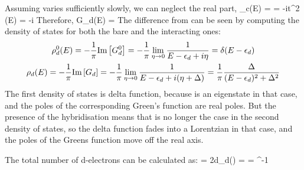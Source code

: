 \documentclass[14pt]{extarticle}
\numberwithin{equation}{section}
\begin{document}
Assuming  varies sufficiently slowly, we can neglect the real part,
\beq
\Sigma_c(E) =  = -i\pi t^2 \rho(E) = -i\Delta
\eeq
Therefore,
\beq
G_d(E) = 
\eeq
The difference from  can be seen by computing the density of states for both the bare and the interacting ones:
\begin{gather}
	\rho_d^0(E) = -\frac{1}{\pi}\text{Im}\left[{G^0_d}\right] = -\frac{1}{\pi} \lim_{\eta \rightarrow 0} \frac{1}{E - \epsilon_d + i\eta} = \delta(E - \epsilon_d)\\
	\rho_d(E) = -\frac{1}{\pi}\text{Im}\left[{G_d}\right]= -\frac{1}{\pi} \lim_{\eta \rightarrow 0} \frac{1}{E - \epsilon_d + i(\eta+\Delta)} = \frac{1}{\pi}\frac{\Delta}{(E-\epsilon_d)^2 + \Delta^2}\label{densitys}
\end{gather}
The first density of states is delta function, because  is an eigenstate in that case, and the poles of the corresponding Green's function are real poles.
But the presence of the hybridisation means that is no longer the case in the second density of states, so the delta function fades into a Lorentzian in that case, and the poles of the Greens function move off the real axis.

The total number of d-electrons can be calculated as:
\beq[total]
 = 2\int d\epsilon \rho_d(\epsilon) = \fr{2\Delta}{\pi} \int {} = \cot^{-1}
\eeq
\end{document}
